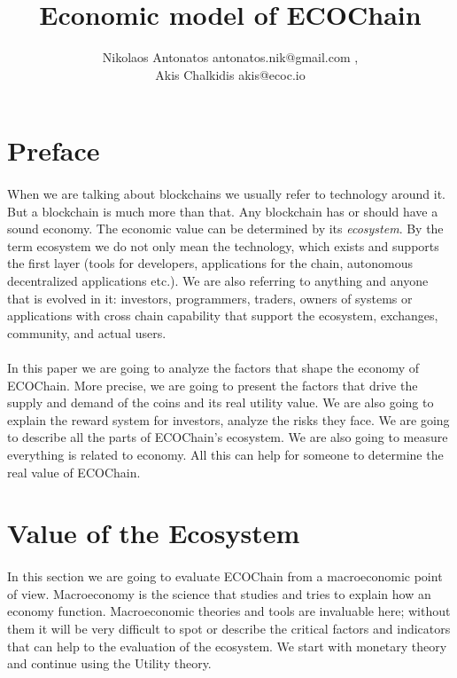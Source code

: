 \documentclass{article}
\title{Economic model of ECOChain}
\author{Nikolaos Antonatos antonatos.nik@gmail.com , \\
Akis Chalkidis akis@ecoc.io}
\begin{document}
\pagecolor{bg}
\maketitle
\tableofcontents
\newpage

\section{Preface}
\paragraph{}
	When we are talking about blockchains we usually refer to technology around it. But a blockchain is much more than that. Any blockchain has or should have a sound economy. The economic value can be determined by its \emph{ecosystem}. By the term ecosystem we do not only mean the technology, which exists and supports the first layer (tools for developers, applications for the chain, autonomous decentralized applications etc.). We are also referring to anything and anyone that is evolved in it: investors, programmers, traders, owners of systems or applications with cross chain capability that support the ecosystem, exchanges, community, and actual users.
\paragraph{}
	In this paper we are going to analyze the factors that shape the economy of ECOChain. More precise, we are going to present the factors that drive the supply and demand of the coins and its real utility value. We are also going to explain the reward system for investors, analyze the risks they face. We are going to describe all the parts of ECOChain's ecosystem. We are also going to measure everything is related to economy. All this can help for someone to determine the real value of ECOChain.

\section{Value of the Ecosystem}
\paragraph{}
In this section we are going to evaluate ECOChain from a macroeconomic point of view. Macroeconomy is the science that studies and tries to explain how an economy function. Macroeconomic theories and tools are invaluable here; without them it will be very difficult to spot or describe the critical factors and indicators that can help to the evaluation of the ecosystem. We start with monetary theory and continue using the Utility theory.
\end{document}

